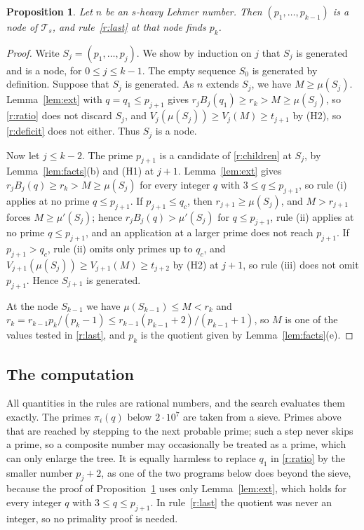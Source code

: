 \documentclass[11pt,reqno]{amsart}
\numberwithin{equation}{section}
\theoremstyle{plain}
\newtheorem{proposition}[theorem]{Proposition}
\theoremstyle{definition}
\theoremstyle{remark}
\begin{document}
\begin{proposition}\label{prop:complete}
Let $n$ be an $s$-heavy Lehmer number. Then $(p_1,\dots,p_{k-1})$ is a
node of $\mathcal T_s$, and rule~\ref{r:last} at that node finds
$p_k$.
\end{proposition}

\begin{proof}
Write $S_j=(p_1,\dots,p_j)$. We show by induction on $j$ that $S_j$
is generated and is a node, for $0\le j\le k-1$. The empty sequence
$S_0$ is generated by definition. Suppose that $S_j$ is generated. As
$n$ extends $S_j$, we have $M\ge\mu(S_j)$. Lemma~\ref{lem:ext} with
$q=q_1\le p_{j+1}$ gives $r_jB_j(q_1)\ge r_k>M\ge\mu(S_j)$, so
\ref{r:ratio} does not discard $S_j$, and $V_j(\mu(S_j))\ge
V_j(M)\ge t_{j+1}$ by (H2), so \ref{r:deficit} does not either. Thus
$S_j$ is a node.

Now let $j\le k-2$. The prime $p_{j+1}$ is a candidate of
\ref{r:children} at $S_j$, by Lemma~\ref{lem:facts}(b) and (H1) at
$j+1$. Lemma~\ref{lem:ext} gives $r_jB_j(q)\ge r_k>M\ge\mu(S_j)$ for
every integer $q$ with $3\le q\le p_{j+1}$, so rule (i) applies at no
prime $q\le p_{j+1}$. If $p_{j+1}\le q_c$, then $r_{j+1}\ge\mu(S_j)$,
and $M>r_{j+1}$ forces $M\ge\mu'(S_j)$; hence $r_jB_j(q)>\mu'(S_j)$
for $q\le p_{j+1}$, rule (ii) applies at no prime $q\le p_{j+1}$, and
an application at a larger prime does not reach $p_{j+1}$. If
$p_{j+1}>q_c$, rule (ii) omits only primes up to $q_c$, and
$V_{j+1}(\mu(S_j))\ge V_{j+1}(M)\ge t_{j+2}$ by (H2) at $j+1$, so
rule (iii) does not omit $p_{j+1}$. Hence $S_{j+1}$ is generated.

At the node $S_{k-1}$ we have $\mu(S_{k-1})\le M<r_k$ and
$r_k=r_{k-1}p_k/(p_k-1)\le r_{k-1}(p_{k-1}+2)/(p_{k-1}+1)$, so $M$ is
one of the values tested in \ref{r:last}, and $p_k$ is the quotient
given by Lemma~\ref{lem:facts}(e).
\end{proof}

\subsection{The computation}
All quantities in the rules are rational numbers, and the search
evaluates them exactly. The primes $\pi_i(q)$ below $2\cdot10^7$ are
taken from a sieve. Primes above that are reached by stepping to the
next probable prime; such a step never skips a prime, so a composite
number may occasionally be treated as a prime, which can only enlarge
the tree. It is equally harmless to replace $q_1$ in \ref{r:ratio} by
the smaller number $p_j+2$, as one of the two programs below does
beyond the sieve, because the proof of
Proposition~\ref{prop:complete} uses only Lemma~\ref{lem:ext}, which
holds for every integer $q$ with $3\le q\le p_{j+1}$. In
rule~\ref{r:last} the quotient was never an integer, so no primality
proof is needed.
\end{document}
